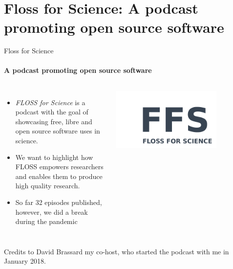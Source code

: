 \section{Floss for Science: A podcast promoting open source software}

\begin{frame}{Floss for Science}
\framesubtitle{A podcast promoting open source software}

    \begin{columns}
    \begin{itemize}
        \item \textit{FLOSS for Science} is a podcast with the goal of showcasing free, libre and open source software uses in science. 
        \item We want to highlight how FLOSS empowers researchers and enables them to produce high quality research. 
        \item So far 32 episodes published, however, we did a break during the pandemic
    \end{itemize}
        
        \centering
        \includegraphics[width=0.75\textwidth]{floss-logo.png}
    \end{columns}
    \vspace{0.5cm}
Credits to David Brassard my co-host, who started the podcast with me in January 2018.
\end{frame}

